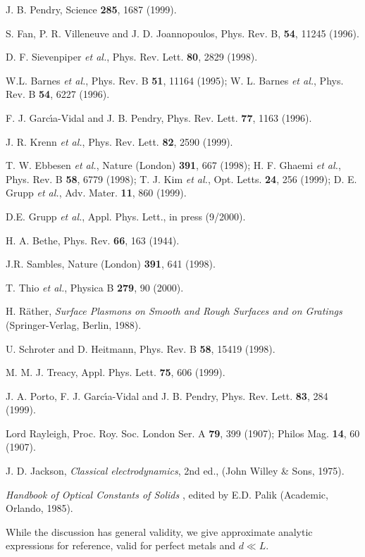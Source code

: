 \begin{references}

J. B. Pendry, Science {\bf 285}, 1687 (1999).

S. Fan, P. R. Villeneuve and J. D. Joannopoulos, Phys. Rev. B, {\bf 54}, 11245
(1996).

D. F. Sievenpiper {\it et al.}, Phys. Rev. Lett. {\bf 80}, 2829 (1998).

W.L. Barnes {\it et al.}, Phys. Rev. B {\bf 51}, 11164 (1995);
W. L. Barnes {\it et al.}, Phys. Rev. B {\bf 54}, 6227 (1996).

F. J. Garc\'{\i}a-Vidal and J. B. Pendry, Phys. Rev. Lett.
{\bf 77}, 1163 (1996).

J. R. Krenn {\it et al.}, Phys. Rev. Lett. {\bf 82}, 2590 (1999).

T. W. Ebbesen {\it et al.}, Nature (London) {\bf 391}, 667 (1998);
H. F. Ghaemi {\it et al.}, Phys. Rev. B {\bf 58}, 6779 (1998);
T. J. Kim {\it et al.}, Opt. Letts. {\bf 24}, 256 (1999);
D. E. Grupp {\it et al.}, Adv. Mater. {\bf 11}, 860 (1999).

D.E. Grupp {\it et al.}, Appl. Phys. Lett., in press (9/2000).

H. A. Bethe, Phys. Rev. {\bf 66}, 163 (1944).

J.R. Sambles, Nature (London) {\bf 391}, 641  (1998).

T. Thio {\it et al.}, Physica B {\bf 279}, 90 (2000).

H. R\"ather, {\it Surface Plasmons on Smooth and Rough Surfaces and on Gratings}
(Springer-Verlag, Berlin, 1988).

U. Schroter and D. Heitmann, Phys. Rev. B  {\bf 58}, 15419 (1998).

M. M. J. Treacy, Appl. Phys. Lett. {\bf 75}, 606 (1999).

J. A. Porto, F. J. Garc\'{\i}a-Vidal and J. B. Pendry, Phys. Rev. Lett.
{\bf 83}, 284 (1999).

Lord Rayleigh, Proc. Roy. Soc. London Ser. A {\bf 79}, 399 (1907);
Philos Mag. {\bf 14}, 60 (1907).

J. D. Jackson, {\it Classical electrodynamics}, 2nd ed., 
(John Willey \& Sons, 1975).

{\it Handbook of Optical Constants of
Solids }, edited by E.D. Palik  (Academic, Orlando, 1985).

While the discussion has general validity, we give approximate 
analytic expressions 
for reference, valid for perfect metals and $d\ll L$.

\end{references}

